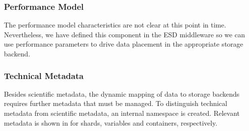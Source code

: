 \documentclass{../../template/esiwace-report}
\begin{document}
















\subsubsection{Performance Model}
The performance model characteristics are not clear at this point in time. Nevertheless, we have defined this component in the
ESD middleware so we can use performance parameters to drive data placement in the appropriate storage backend.

\subsubsection{Technical Metadata}
Besides scientific metadata, the dynamic mapping of data to storage backends requires further metadata that must be managed.
To distinguish technical metadata from scientific metadata, an internal namespace is created.
Relevant metadata is shown in  for shards, variables and containers, respectively.
\end{document}
